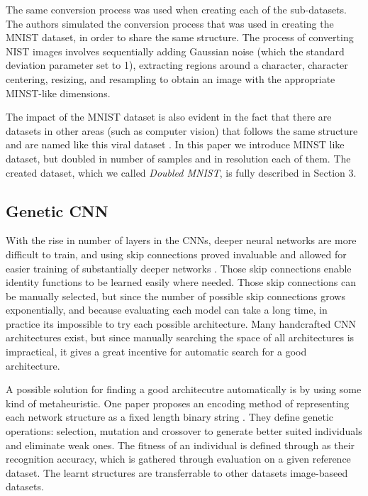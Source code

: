 \documentclass[eng]{simposium}
\begin{document}
The same conversion process was used when creating each of the sub-datasets. 
The authors simulated the conversion process that was used in creating the MNIST dataset, in order 
to share the same structure. 
The process of converting NIST images involves sequentially adding Gaussian noise (which the standard deviation parameter set to 1), 
extracting regions around a character, character centering, resizing, and resampling to obtain an image with the appropriate MINST-like dimensions. 

The impact of the MNIST dataset is also evident in the fact that there are datasets in other areas (such as computer vision) that
follows the same structure and are named like this viral dataset \cite{27}. 
In this paper we introduce MINST like dataset, but doubled in number of samples and in resolution each of them. 
The created dataset, which we called \textit{Doubled MNIST}, is fully described in Section 3. 

\subsection{Genetic CNN}

With the rise in number of layers in the CNNs, deeper neural networks are more difficult to train, and using skip connections proved invaluable and allowed 
for easier training of substantially deeper networks \cite{6}. Those skip connections enable identity functions to be learned easily where needed.
Those skip connections can be manually selected, but since the number of possible skip connections grows exponentially, and because evaluating each model can take a long time, 
in practice its impossible to try each possible architecture.
Many handcrafted CNN architectures exist, but since manually searching the space of all architectures is impractical, it gives a great incentive for automatic search 
for a good architecture.

A possible solution for finding a good architecutre automatically is by using some kind of metaheuristic. 
One paper proposes an encoding method of representing each network structure as a fixed length binary string \cite{4}. 
They define genetic operations: selection, mutation and crossover to generate better suited individuals and eliminate weak ones.
The fitness of an individual is defined through as their recognition accuracy, which is gathered through evaluation on a given reference dataset.
The learnt structures are transferrable to other datasets image-baseed datasets.
\end{document}

